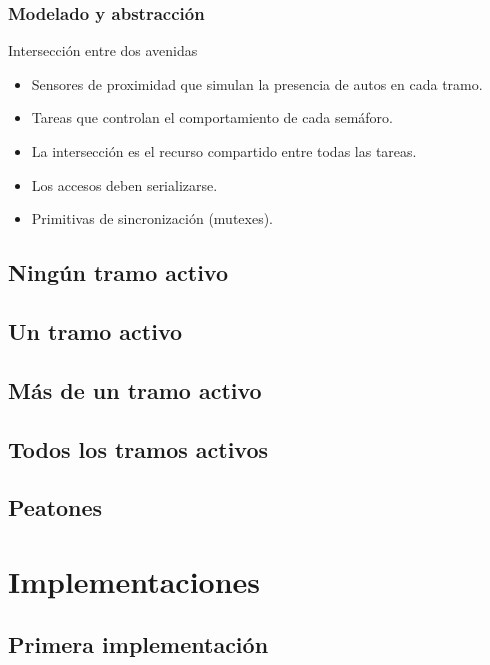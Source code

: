 \begin{frame}
\frametitle{Modelado y abstracción}
\begin{block}{Intersección entre dos avenidas}
	\begin{itemize}
		\item Sensores de proximidad que simulan la presencia de autos en cada tramo.
		\item Tareas que controlan el comportamiento de cada semáforo.
		\item La intersección es el recurso compartido entre todas las tareas.
		\item Los accesos deben serializarse.
		\item Primitivas de sincronización (mutexes).
	\end{itemize}
\end{block}
\end{frame}

\subsection{Ningún tramo activo}

\subsection{Un tramo activo}

\subsection{Más de un tramo activo}

\subsection{Todos los tramos activos}

\subsection{Peatones}

\section{Implementaciones}

\subsection{Primera implementación}

